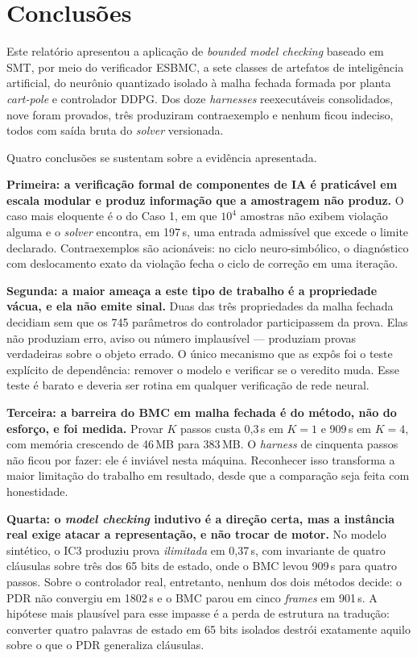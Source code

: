 \section{Conclusões}
\label{sec:conclusao}

Este relatório apresentou a aplicação de \textit{bounded model checking} baseado em SMT, por
meio do verificador ESBMC, a sete classes de artefatos de inteligência artificial, do neurônio
quantizado isolado à malha fechada formada por planta \textit{cart-pole} e controlador DDPG.
Dos doze \textit{harnesses} reexecutáveis consolidados, nove foram provados, três produziram
contraexemplo e nenhum ficou indeciso, todos com saída bruta do \textit{solver} versionada.

Quatro conclusões se sustentam sobre a evidência apresentada.

\textbf{Primeira: a verificação formal de componentes de IA é praticável em escala modular e
produz informação que a amostragem não produz.} O caso mais eloquente é o do Caso 1, em que
$10^4$ amostras não exibem violação alguma e o \textit{solver} encontra, em 197\,s, uma
entrada admissível que excede o limite declarado. Contraexemplos são acionáveis: no ciclo
neuro-simbólico, o diagnóstico com deslocamento exato da violação fecha o ciclo de correção em
uma iteração.

\textbf{Segunda: a maior ameaça a este tipo de trabalho é a propriedade vácua, e ela não emite
sinal.} Duas das três propriedades da malha fechada decidiam sem que os 745 parâmetros do
controlador participassem da prova. Elas não produziam erro, aviso ou número implausível ---
produziam provas verdadeiras sobre o objeto errado. O único mecanismo que as expôs foi o teste
explícito de dependência: remover o modelo e verificar se o veredito muda. Esse teste é barato
e deveria ser rotina em qualquer verificação de rede neural.

\textbf{Terceira: a barreira do BMC em malha fechada é do método, não do esforço, e foi
medida.} Provar $K$ passos custa 0,3\,s em $K{=}1$ e 909\,s em $K{=}4$, com memória crescendo
de 46\,MB para 383\,MB. O \textit{harness} de cinquenta passos não ficou por fazer: ele é
inviável nesta máquina. Reconhecer isso transforma a maior limitação do trabalho em resultado,
desde que a comparação seja feita com honestidade.

\textbf{Quarta: o \textit{model checking} indutivo é a direção certa, mas a instância real
exige atacar a representação, e não trocar de motor.} No modelo sintético, o IC3 produziu
prova \emph{ilimitada} em 0,37\,s, com invariante de quatro cláusulas sobre três dos 65 bits
de estado, onde o BMC levou 909\,s para quatro passos. Sobre o controlador real, entretanto,
nenhum dos dois métodos decide: o PDR não convergiu em 1802\,s e o BMC parou em cinco
\textit{frames} em 901\,s. A hipótese mais plausível para esse impasse é a perda de estrutura
na tradução: converter quatro palavras de estado em 65 bits isolados destrói exatamente aquilo
sobre o que o PDR generaliza cláusulas.

